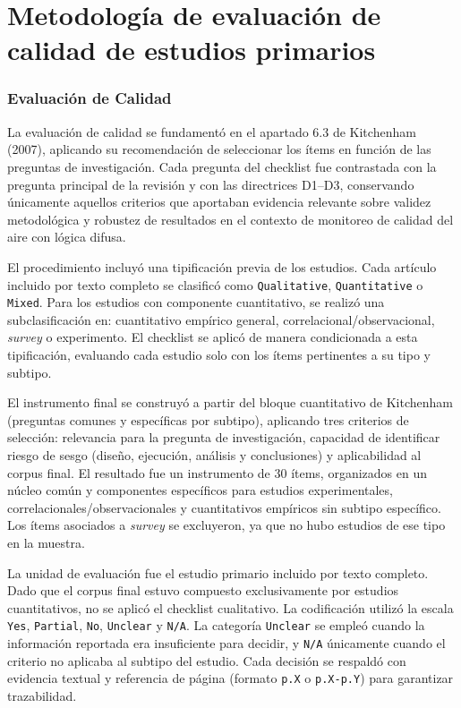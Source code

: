 \section{Metodología de evaluación de calidad de estudios primarios}
\label{sec:qa_metodologia}

\subsubsection{Evaluación de Calidad}

La evaluación de calidad se fundamentó en el apartado 6.3 de Kitchenham (2007), aplicando su recomendación de seleccionar los ítems en función de las preguntas de investigación. Cada pregunta del checklist fue contrastada con la pregunta principal de la revisión y con las directrices D1--D3, conservando únicamente aquellos criterios que aportaban evidencia relevante sobre validez metodológica y robustez de resultados en el contexto de monitoreo de calidad del aire con lógica difusa.

El procedimiento incluyó una tipificación previa de los estudios. Cada artículo incluido por texto completo se clasificó como \texttt{Qualitative}, \texttt{Quantitative} o \texttt{Mixed}. Para los estudios con componente cuantitativo, se realizó una subclasificación en: cuantitativo empírico general, correlacional/observacional, \textit{survey} o experimento. El checklist se aplicó de manera condicionada a esta tipificación, evaluando cada estudio solo con los ítems pertinentes a su tipo y subtipo.

El instrumento final se construyó a partir del bloque cuantitativo de Kitchenham (preguntas comunes y específicas por subtipo), aplicando tres criterios de selección: relevancia para la pregunta de investigación, capacidad de identificar riesgo de sesgo (diseño, ejecución, análisis y conclusiones) y aplicabilidad al corpus final. El resultado fue un instrumento de 30 ítems, organizados en un núcleo común y componentes específicos para estudios experimentales, correlacionales/observacionales y cuantitativos empíricos sin subtipo específico. Los ítems asociados a \textit{survey} se excluyeron, ya que no hubo estudios de ese tipo en la muestra.

La unidad de evaluación fue el estudio primario incluido por texto completo. Dado que el corpus final estuvo compuesto exclusivamente por estudios cuantitativos, no se aplicó el checklist cualitativo. La codificación utilizó la escala \texttt{Yes}, \texttt{Partial}, \texttt{No}, \texttt{Unclear} y \texttt{N/A}. La categoría \texttt{Unclear} se empleó cuando la información reportada era insuficiente para decidir, y \texttt{N/A} únicamente cuando el criterio no aplicaba al subtipo del estudio. Cada decisión se respaldó con evidencia textual y referencia de página (formato \texttt{p.X} o \texttt{p.X-p.Y}) para garantizar trazabilidad.

